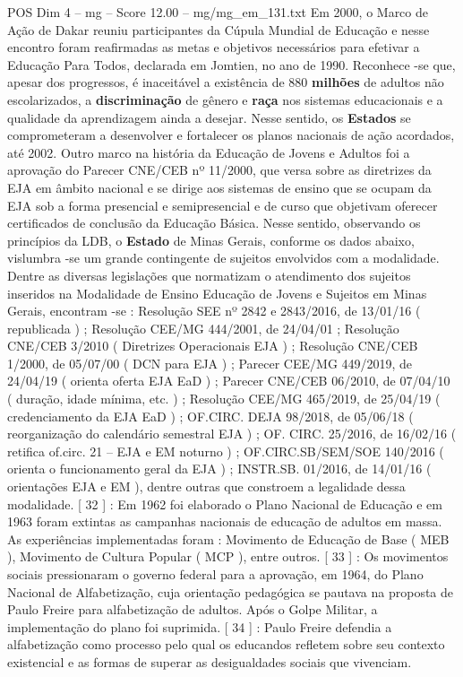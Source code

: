 \begin{textsample}{POS Dim 4 – mg – Score 12.00 – mg/mg\_em\_131.txt}
Em 2000, o Marco de Ação de Dakar reuniu participantes da Cúpula Mundial de Educação e nesse encontro foram reafirmadas as metas e objetivos necessários para efetivar a Educação Para Todos, declarada em Jomtien, no ano de 1990.
Reconhece -se que, apesar dos progressos, é inaceitável a existência de 880 \textbf{milhões} de adultos não escolarizados, a \textbf{discriminação} de gênero e \textbf{raça} nos sistemas educacionais e a qualidade da aprendizagem ainda a desejar.
Nesse sentido, os \textbf{Estados} se comprometeram a desenvolver e fortalecer os planos nacionais de ação acordados, até 2002.
Outro marco na história da Educação de Jovens e Adultos foi a aprovação do Parecer CNE/CEB nº 11/2000, que versa sobre as diretrizes da EJA em âmbito nacional e se dirige aos sistemas de ensino que se ocupam da EJA sob a forma presencial e semipresencial e de curso que objetivam oferecer certificados de conclusão da Educação Básica.
Nesse sentido, observando os princípios da LDB, o \textbf{Estado} de Minas Gerais, conforme os dados abaixo, vislumbra -se um grande contingente de sujeitos envolvidos com a modalidade.
Dentre as diversas legislações que normatizam o atendimento dos sujeitos inseridos na Modalidade de Ensino Educação de Jovens e Sujeitos em Minas Gerais, encontram -se : Resolução SEE nº 2842 e 2843/2016, de 13/01/16 ( republicada ) ; Resolução CEE/MG 444/2001, de 24/04/01 ; Resolução CNE/CEB 3/2010 ( Diretrizes Operacionais EJA ) ; Resolução CNE/CEB 1/2000, de 05/07/00 ( DCN para EJA ) ; Parecer CEE/MG 449/2019, de 24/04/19 ( orienta oferta EJA EaD ) ; Parecer CNE/CEB 06/2010, de 07/04/10 ( duração, idade mínima, etc. ) ; Resolução CEE/MG 465/2019, de 25/04/19 ( credenciamento da EJA EaD ) ; OF.CIRC.
DEJA 98/2018, de 05/06/18 ( reorganização do calendário semestral EJA ) ; OF.
CIRC. 25/2016, de 16/02/16 ( retifica of.circ. 21 – EJA e EM noturno ) ; OF.CIRC.SB/SEM/SOE 140/2016 ( orienta o funcionamento geral da EJA ) ; INSTR.SB. 01/2016, de 14/01/16 ( orientações EJA e EM ), dentre outras que constroem a legalidade dessa modalidade. [ 32 ] : Em 1962 foi elaborado o Plano Nacional de Educação e em 1963 foram extintas as campanhas nacionais de educação de adultos em massa.
As experiências implementadas foram : Movimento de Educação de Base ( MEB ), Movimento de Cultura Popular ( MCP ), entre outros. [ 33 ] : Os movimentos sociais pressionaram o governo federal para a aprovação, em 1964, do Plano Nacional de Alfabetização, cuja orientação pedagógica se pautava na proposta de Paulo Freire para alfabetização de adultos.
Após o Golpe Militar, a implementação do plano foi suprimida. [ 34 ] : Paulo Freire defendia a alfabetização como processo pelo qual os educandos refletem sobre seu contexto existencial e as formas de superar as desigualdades sociais que vivenciam.

\end{textsample}
